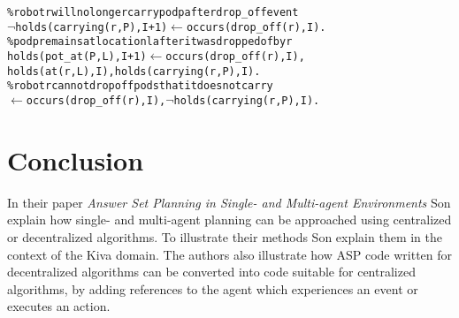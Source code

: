 \documentclass[runningheads]{llncs}
\newcommand{\papertitle}{Answer Set Planning in Single- and Multi-agent Environments}
\newcommand{\authorquote}{Son \etal}
\begin{document}
    \vspace{0.6cm}
    
\begin{alltt}
   \% robot r will no longer carry pod p after drop_off event
   \(\neg\)holds(carrying(r, P), I + 1) \(\leftarrow\) occurs(drop_off(r), I).
   \% pod p remains at location l after it was dropped of by r
   holds(pot_at(P, L), I + 1) \(\leftarrow\) occurs(drop_off(r), I), 
       holds(at(r, L), I), holds(carrying(r, P), I). 
   \% robot r cannot drop off pods that it does not carry
   \(\leftarrow\) occurs(drop_off(r), I), \(\neg\)holds(carrying(r, P), I). 
\end{alltt}









\section{Conclusion} \label{8:sec:conclusion}

In their paper \textit{\papertitle{}} \authorquote{} explain how single- and multi-agent planning can be approached using centralized or decentralized algorithms. To illustrate their methods \authorquote{} explain them in the context of the Kiva domain. The authors also illustrate how ASP code written for decentralized algorithms can be converted into code suitable for centralized algorithms, by adding references to the agent which experiences an event or executes an action.

\end{document}
